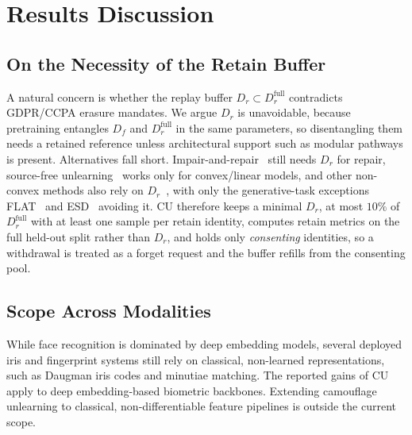\section{Results Discussion}

\subsection{On the Necessity of the Retain Buffer}
\label{8.1}
A natural concern is whether the replay buffer $D_r \subset D_r^{\text{full}}$ contradicts GDPR/CCPA erasure mandates. We argue $D_r$ is unavoidable, because pretraining entangles $D_f$ and $D_r^{\text{full}}$ in the same parameters, so disentangling them needs a retained reference unless architectural support such as modular pathways is present. Alternatives fall short. Impair-and-repair~\cite{tarun2023fast} still needs $D_r$ for repair, source-free unlearning~\cite{ahmed2025towards} works only for convex/linear models, and other non-convex methods also rely on $D_r$~\cite{kirkpatrick2017overcoming,fan2023salun,kurmanji2023towards,zhao2024continual,shibata2021learning,adhikari2025unlearning,liu2022continual,chatterjee2024unified,huang2025unified}, with only the generative-task exceptions FLAT~\cite{wang2024llm} and ESD~\cite{gandikota2023erasing} avoiding it. CU therefore keeps a minimal $D_r$, at most $10\%$ of $D_r^{\text{full}}$ with at least one sample per retain identity, computes retain metrics on the full held-out split rather than $D_r$, and holds only \emph{consenting} identities, so a withdrawal is treated as a forget request and the buffer refills from the consenting pool.

\subsection{Scope Across Modalities}
While face recognition is dominated by deep embedding models, several deployed iris and fingerprint systems still rely on classical, non-learned representations, such as Daugman iris codes and minutiae matching. The reported gains of CU apply to deep embedding-based biometric backbones. Extending camouflage unlearning to classical, non-differentiable feature pipelines is outside the current scope.